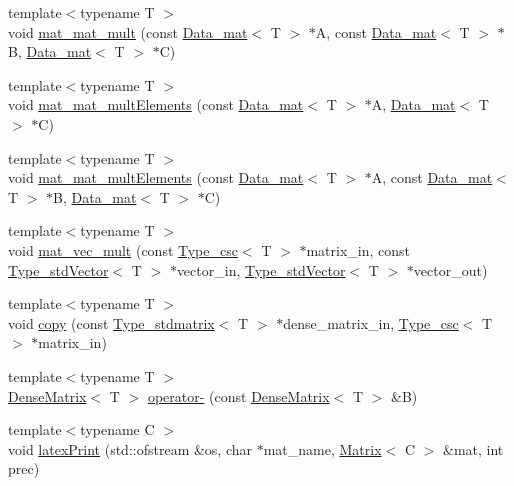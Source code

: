 \begin{DoxyCompactItemize}
\item 
{\footnotesize template$<$typename T $>$ }\\void \hyperlink{namespacelmx_a40ee618d4c91a8e7c21b2cc4d068c362}{mat\-\_\-mat\-\_\-mult} (const \hyperlink{classlmx_1_1Data__mat}{Data\-\_\-mat}$<$ T $>$ $\ast$A, const \hyperlink{classlmx_1_1Data__mat}{Data\-\_\-mat}$<$ T $>$ $\ast$B, \hyperlink{classlmx_1_1Data__mat}{Data\-\_\-mat}$<$ T $>$ $\ast$C)
\item 
{\footnotesize template$<$typename T $>$ }\\void \hyperlink{namespacelmx_a56cc87866206c207bc234d4c97927e85}{mat\-\_\-mat\-\_\-mult\-Elements} (const \hyperlink{classlmx_1_1Data__mat}{Data\-\_\-mat}$<$ T $>$ $\ast$A, \hyperlink{classlmx_1_1Data__mat}{Data\-\_\-mat}$<$ T $>$ $\ast$C)
\item 
{\footnotesize template$<$typename T $>$ }\\void \hyperlink{namespacelmx_af1b580875370f953da3267438d3fa186}{mat\-\_\-mat\-\_\-mult\-Elements} (const \hyperlink{classlmx_1_1Data__mat}{Data\-\_\-mat}$<$ T $>$ $\ast$A, const \hyperlink{classlmx_1_1Data__mat}{Data\-\_\-mat}$<$ T $>$ $\ast$B, \hyperlink{classlmx_1_1Data__mat}{Data\-\_\-mat}$<$ T $>$ $\ast$C)
\item 
{\footnotesize template$<$typename T $>$ }\\void \hyperlink{namespacelmx_a6d30cefa412621b55332f3521b828010}{mat\-\_\-vec\-\_\-mult} (const \hyperlink{classlmx_1_1Type__csc}{Type\-\_\-csc}$<$ T $>$ $\ast$matrix\-\_\-in, const \hyperlink{classlmx_1_1Type__stdVector}{Type\-\_\-std\-Vector}$<$ T $>$ $\ast$vector\-\_\-in, \hyperlink{classlmx_1_1Type__stdVector}{Type\-\_\-std\-Vector}$<$ T $>$ $\ast$vector\-\_\-out)
\item 
{\footnotesize template$<$typename T $>$ }\\void \hyperlink{namespacelmx_ab8da9d846c786511bc3954fbbc996ff7}{copy} (const \hyperlink{classlmx_1_1Type__stdmatrix}{Type\-\_\-stdmatrix}$<$ T $>$ $\ast$dense\-\_\-matrix\-\_\-in, \hyperlink{classlmx_1_1Type__csc}{Type\-\_\-csc}$<$ T $>$ $\ast$matrix\-\_\-in)
\item 
{\footnotesize template$<$typename T $>$ }\\\hyperlink{classlmx_1_1DenseMatrix}{Dense\-Matrix}$<$ T $>$ \hyperlink{namespacelmx_a5e17aca45e56e69469e6b3e58ce074e5}{operator-\/} (const \hyperlink{classlmx_1_1DenseMatrix}{Dense\-Matrix}$<$ T $>$ \&B)
\item 
{\footnotesize template$<$typename C $>$ }\\void \hyperlink{namespacelmx_ad4464704dd30fa4aa45fef794428ab35}{latex\-Print} (std\-::ofstream \&os, char $\ast$mat\-\_\-name, \hyperlink{classlmx_1_1Matrix}{Matrix}$<$ C $>$ \&mat, int prec)

\end{DoxyCompactItemize}
